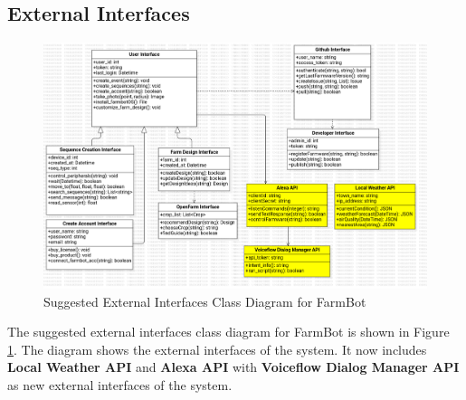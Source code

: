 \subsection{External Interfaces}
\begin{figure}[H]
    \centering
    \includegraphics[width=1\textwidth]{Figures/SuggestedClassDiagram.png}
    \caption{Suggested External Interfaces Class Diagram for FarmBot}\label{fig:suggested_external_interfaces}
\end{figure}

The suggested external interfaces class diagram for FarmBot is shown in Figure \ref{fig:suggested_external_interfaces}. The diagram shows the external interfaces of the system. It now includes \textbf{Local Weather API} and \textbf{Alexa API} with \textbf{Voiceflow Dialog Manager API} as new external interfaces of the system.

